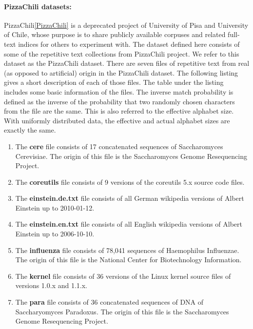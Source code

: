 \documentclass[english,twoside,censored,csm,algorithms-track-2020]{HYthesisML}
\theoremstyle{plain}
\theoremstyle{definition}
\begin{document}
\paragraph{PizzaChili datasets:}
PizzaChili\ref{PizzaChili} is a deprecated project of University of Pisa and University of Chile,
whose purpose is to
share publicly available corpuses and related full-text indices for others to experiment with.
The dataset defined here consists of some of the repetitive text collections from PizzaChili project.
We refer to this dataset as the PizzaChili dataset.
There are seven files of repetitive text from real (as opposed to artificial) origin in the
PizzaChili dataset. The following listing gives a short description of each of those files. The table
under the listing includes some basic information of the files. The inverse match probability is defined
as the inverse of the probability that two randomly chosen characters from the file are the same. This
is also referred to the effective alphabet size. With uniformly distributed data, the effective and
actual alphabet sizes are exactly the same.

\begin{enumerate}
\item The \textbf{cere} file consists of 17 concatenated sequences of Saccharomyces Cerevisiae. The origin of this file is the Saccharomyces Genome Resequencing Project.
\item The \textbf{coreutils} file consists of 9 versions of the coreutils 5.x source code files.
\item The \textbf{einstein.de.txt} file consists of all German wikipedia versions of Albert Einstein up to 2010-01-12.
\item  The \textbf{einstein.en.txt} file consists of all English wikipedia versions of Albert Einstein up to 2006-10-10.
\item The \textbf{influenza} file consists of 78,041 sequences of Haemophilus Influenzae. The origin of this file is the National Center for Biotechnology Information.
\item The \textbf{kernel} file consists of 36 versions of the Linux kernel source files of versions 1.0.x and 1.1.x.
\item The \textbf{para} file consists of 36 concatenated sequences of DNA of Saccharyomyces Paradoxus. The origin of this file is the Saccharomyces Genome Resequencing Project.
\end{enumerate}
\end{document}
